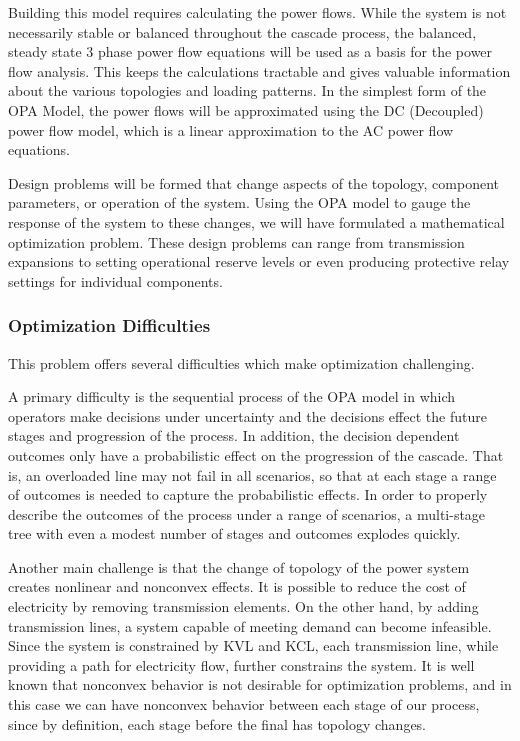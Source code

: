 Building this model requires calculating the power flows.  While the system is not necessarily stable or balanced throughout the cascade process, the balanced, steady state 3 phase power flow equations will be used as a basis for the power flow analysis.  This keeps the calculations tractable and gives valuable information about the various topologies and loading patterns.  In the simplest form of the OPA Model, the power flows will be approximated using the DC (Decoupled) power flow model, which is a linear approximation to the AC power flow equations.


Design problems will be formed that change aspects of the topology, component parameters, or operation of the system.  Using the OPA model to gauge the response of the system to these changes, we will have formulated a mathematical optimization problem.  These design problems can range from transmission expansions to setting operational reserve levels or even producing protective relay settings for individual components.

\subsubsection{Optimization Difficulties}
This problem offers several difficulties which make optimization challenging.  

A primary difficulty is the sequential process of the OPA model in which operators make decisions under uncertainty and the decisions effect the future stages and progression of the process.  In addition, the decision dependent outcomes only have a probabilistic effect on the progression of the cascade.  That is, an overloaded line may not fail in all scenarios, so that at each stage a range of outcomes is needed to capture the probabilistic effects.  In order to properly describe the outcomes of the process under a range of scenarios, a multi-stage tree with even a modest number of stages and outcomes explodes quickly.

Another main challenge is that the change of topology of the power system creates nonlinear and nonconvex effects.  It is possible to reduce the cost of electricity by removing transmission elements.  On the other hand, by adding transmission lines, a system capable of meeting demand can become infeasible.  Since the system is constrained by KVL and KCL, each transmission line, while providing a path for electricity flow, further constrains the system.  It is well known that nonconvex behavior is not desirable for optimization problems, and in this case we can have nonconvex behavior between each stage of our process, since by definition, each stage before the final has topology changes.

